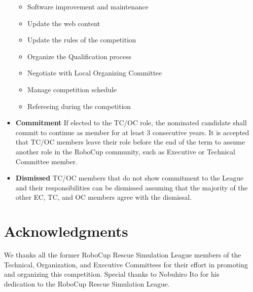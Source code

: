 \documentclass{article}
\begin{document}
\begin{itemize}
\begin{itemize}
    \item Software improvement and maintenance
    \item Update the web content
    \item Update the rules of the competition
    \item Organize the Qualification process
    \item Negotiate with Local Organizing Committee
    \item Manage competition schedule
    \item Refereeing during the competition
  \end{itemize}
  \item \textbf{Commitment} If elected to the TC/OC role, the nominated
  candidate shall commit to continue as member for at least 3 consecutive years.
  It is accepted that TC/OC members leave their role before the end of the term
  to assume another role in the RoboCup community, such as Executive or
  Technical Committee member.
  \item \textbf{Dismissed} TC/OC members that do not show commitment to the
  League and their responsibilities can be dismissed assuming that the majority
  of the other EC, TC, and OC members agree with the dismissal.
\end{itemize}
\section*{Acknowledgments}
We thanks all the former RoboCup Rescue Simulation League members of the 
Technical, Organization, and Executive Committees for their effort in promoting 
and organizing this competition. Special thanks to Nobuhiro Ito for his
dedication to the RoboCup Rescue Simulation League.
\newpage
\appendix
\end{document}
